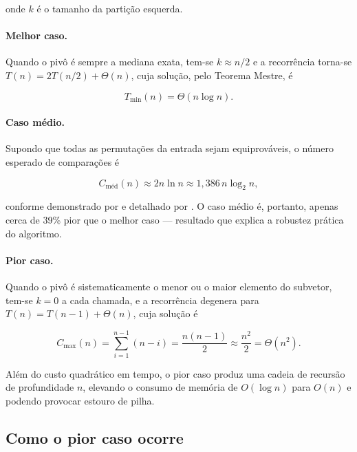 onde $k$ é o tamanho da partição esquerda.

\paragraph{Melhor caso.} Quando o pivô é sempre a mediana exata, tem-se
$k \approx n/2$ e a recorrência torna-se $T(n) = 2T(n/2) + \Theta(n)$, cuja solução,
pelo Teorema Mestre, é

\begin{equation}
T_{\min}(n) = \Theta(n \log n).
\end{equation}

\paragraph{Caso médio.} Supondo que todas as permutações da entrada sejam
equiprováveis, o número esperado de comparações é

\begin{equation}
C_{\text{méd}}(n) \approx 2n \ln n \approx 1{,}386\, n \log_2 n,
\end{equation}

conforme demonstrado por  e detalhado por
. O caso médio é, portanto, apenas cerca de 39\% pior que o
melhor caso --- resultado que explica a robustez prática do algoritmo.

\paragraph{Pior caso.} Quando o pivô é sistematicamente o menor ou o maior elemento
do subvetor, tem-se $k = 0$ a cada chamada, e a recorrência degenera para
$T(n) = T(n-1) + \Theta(n)$, cuja solução é

\begin{equation}
C_{\max}(n) = \sum_{i=1}^{n-1}(n - i) = \frac{n(n-1)}{2} \approx \frac{n^2}{2} = \Theta(n^2).
\label{eq:piorcaso}
\end{equation}

Além do custo quadrático em tempo, o pior caso produz uma cadeia de recursão de
profundidade $n$, elevando o consumo de memória de $O(\log n)$ para $O(n)$ e podendo
provocar estouro de pilha.

\subsection{Como o pior caso ocorre}
\label{sec:piorcaso}

